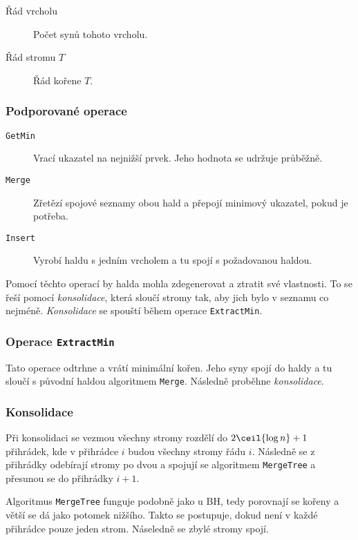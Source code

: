 \begin{description}
    \item[Řád vrcholu] Počet synů tohoto vrcholu.
    \item[Řád stromu $T$] Řád kořene $T$.
\end{description}

\subsubsection{Podporované operace}

\begin{description}
    \item[\texttt{GetMin}] Vrací ukazatel na nejnižší prvek.
    Jeho hodnota se udržuje průběžně.
    \item[\texttt{Merge}] Zřetězí spojové seznamy obou hald a přepojí minimový ukazatel, pokud je potřeba.
    \item[\texttt{Insert}] Vyrobí haldu s jedním vrcholem a tu spojí s požadovanou haldou.
\end{description}

Pomocí těchto operací by halda mohla zdegenerovat a ztratit své vlastnosti.
To se řeší pomocí \textit{konsolidace}, která sloučí stromy tak, aby jich bylo v seznamu co nejméně.
\textit{Konsolidace} se spouští během operace \texttt{ExtractMin}.

\subsubsection{Operace \texttt{ExtractMin}}

Tato operace odtrhne a vrátí minimální kořen.
Jeho syny spojí do haldy a tu sloučí s původní haldou algoritmem \texttt{Merge}.
Následně proběhne \textit{konsolidace}.

\subsubsection{Konsolidace}

Při konsolidaci se vezmou všechny stromy rozdělí do $2\ceil{\log n} + 1$ přihrádek, kde v přihrádce $i$ budou všechny stromy řádu $i$.
Následně se z přihrádky odebírají stromy po dvou a spojují se algoritmem \texttt{MergeTree} a přesunou se do přihrádky $i+1$.

Algoritmus \texttt{MergeTree} funguje podobně jako u BH, tedy porovnají se kořeny a větší se dá jako potomek nižšího.
Takto se postupuje, dokud není v každé přihrádce pouze jeden strom.
Náseledně se zbylé stromy spojí.

